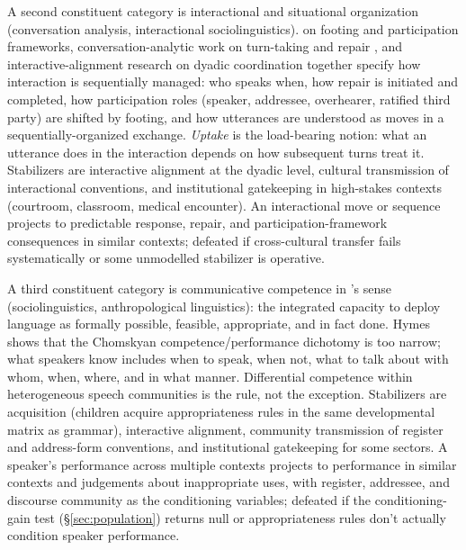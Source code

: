 \documentclass[12pt]{article}
\begin{document}
A second constituent category is interactional and situational organization (conversation analysis, interactional sociolinguistics). \textcite{goffman1981} on footing and participation frameworks, conversation-analytic work on turn-taking and repair \citep{SacksSchegloff1979, Schegloff1977}, and interactive-alignment research on dyadic coordination \citep{PickeringGarrod2004} together specify how interaction is sequentially managed: who speaks when, how repair is initiated and completed, how participation roles (speaker, addressee, overhearer, ratified third party) are shifted by footing, and how utterances are understood as moves in a sequentially-organized exchange. \emph{Uptake} is the load-bearing notion: what an utterance does in the interaction depends on how subsequent turns treat it. Stabilizers are interactive alignment at the dyadic level, cultural transmission of interactional conventions, and institutional gatekeeping in high-stakes contexts (courtroom, classroom, medical encounter). An interactional move or sequence projects to predictable response, repair, and participation-framework consequences in similar contexts; defeated if cross-cultural transfer fails systematically or some unmodelled stabilizer is operative.

A third constituent category is communicative competence in \textcite{hymes1972}'s sense (sociolinguistics, anthropological linguistics): the integrated capacity to deploy language as formally possible, feasible, appropriate, and in fact done. Hymes shows that the Chomskyan competence/performance dichotomy is too narrow; what speakers know includes when to speak, when not, what to talk about with whom, when, where, and in what manner. Differential competence within heterogeneous speech communities is the rule, not the exception. Stabilizers are acquisition (children acquire appropriateness rules in the same developmental matrix as grammar), interactive alignment, community transmission of register and address-form conventions, and institutional gatekeeping for some sectors. A speaker's performance across multiple contexts projects to performance in similar contexts and judgements about inappropriate uses, with register, addressee, and discourse community as the conditioning variables; defeated if the conditioning-gain test (§\ref{sec:population}) returns null or appropriateness rules don't actually condition speaker performance.
\end{document}
